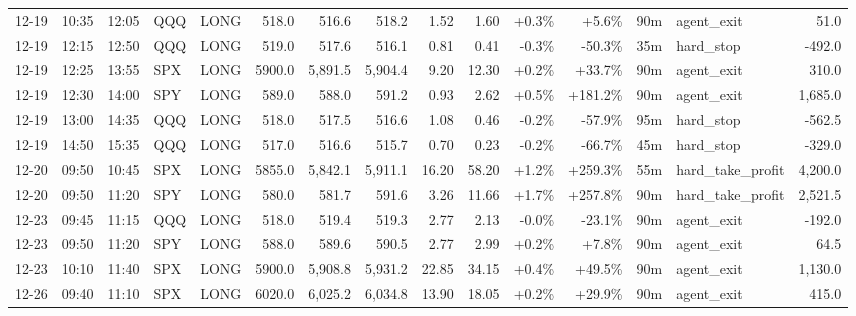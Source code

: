 \documentclass[11pt,a4paper,twoside]{article}
\begin{document}
\begin{landscape}
\begin{center}
\begin{longtable}{>{\color{txtmain}}l l l l l r r r r r r r r >{\color{txtmain}}l r}
12-19 & 10:35 & 12:05 & QQQ & LONG & 518.0 & 516.6 & 518.2 & 1.52 & 1.60 & \textcolor{wingreen}{+0.3\%} & \textcolor{wingreen}{+5.6\%} & 90m & agent\_exit & \textcolor{wingreen}{51.0} \\
12-19 & 12:15 & 12:50 & QQQ & LONG & 519.0 & 517.6 & 516.1 & 0.81 & 0.41 & \textcolor{lossred}{-0.3\%} & \textcolor{lossred}{-50.3\%} & 35m & hard\_stop & \textcolor{lossred}{-492.0} \\
12-19 & 12:25 & 13:55 & SPX & LONG & 5900.0 & 5,891.5 & 5,904.4 & 9.20 & 12.30 & \textcolor{wingreen}{+0.2\%} & \textcolor{wingreen}{+33.7\%} & 90m & agent\_exit & \textcolor{wingreen}{310.0} \\
12-19 & 12:30 & 14:00 & SPY & LONG & 589.0 & 588.0 & 591.2 & 0.93 & 2.62 & \textcolor{wingreen}{+0.5\%} & \textcolor{wingreen}{+181.2\%} & 90m & agent\_exit & \textcolor{wingreen}{1,685.0} \\
12-19 & 13:00 & 14:35 & QQQ & LONG & 518.0 & 517.5 & 516.6 & 1.08 & 0.46 & \textcolor{lossred}{-0.2\%} & \textcolor{lossred}{-57.9\%} & 95m & hard\_stop & \textcolor{lossred}{-562.5} \\
12-19 & 14:50 & 15:35 & QQQ & LONG & 517.0 & 516.6 & 515.7 & 0.70 & 0.23 & \textcolor{lossred}{-0.2\%} & \textcolor{lossred}{-66.7\%} & 45m & hard\_stop & \textcolor{lossred}{-329.0} \\
12-20 & 09:50 & 10:45 & SPX & LONG & 5855.0 & 5,842.1 & 5,911.1 & 16.20 & 58.20 & \textcolor{wingreen}{+1.2\%} & \textcolor{wingreen}{+259.3\%} & 55m & hard\_take\_profit & \textcolor{wingreen}{4,200.0} \\
12-20 & 09:50 & 11:20 & SPY & LONG & 580.0 & 581.7 & 591.6 & 3.26 & 11.66 & \textcolor{wingreen}{+1.7\%} & \textcolor{wingreen}{+257.8\%} & 90m & hard\_take\_profit & \textcolor{wingreen}{2,521.5} \\
12-23 & 09:45 & 11:15 & QQQ & LONG & 518.0 & 519.4 & 519.3 & 2.77 & 2.13 & \textcolor{lossred}{-0.0\%} & \textcolor{lossred}{-23.1\%} & 90m & agent\_exit & \textcolor{lossred}{-192.0} \\
12-23 & 09:50 & 11:20 & SPY & LONG & 588.0 & 589.6 & 590.5 & 2.77 & 2.99 & \textcolor{wingreen}{+0.2\%} & \textcolor{wingreen}{+7.8\%} & 90m & agent\_exit & \textcolor{wingreen}{64.5} \\
12-23 & 10:10 & 11:40 & SPX & LONG & 5900.0 & 5,908.8 & 5,931.2 & 22.85 & 34.15 & \textcolor{wingreen}{+0.4\%} & \textcolor{wingreen}{+49.5\%} & 90m & agent\_exit & \textcolor{wingreen}{1,130.0} \\
12-26 & 09:40 & 11:10 & SPX & LONG & 6020.0 & 6,025.2 & 6,034.8 & 13.90 & 18.05 & \textcolor{wingreen}{+0.2\%} & \textcolor{wingreen}{+29.9\%} & 90m & agent\_exit & \textcolor{wingreen}{415.0} \\

\end{longtable}
\end{center}
\end{landscape}
\end{document}
